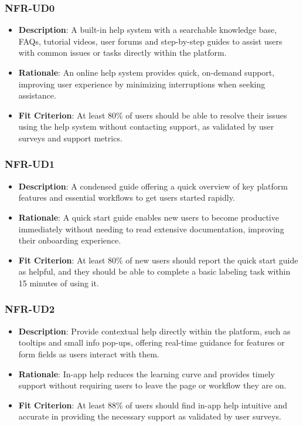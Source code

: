 \documentclass[12pt]{article}
\begin{document}
        \subsubsection*{NFR-UD0} 
        \label{sec:UD0}
        \begin{itemize} 
            \item \textbf{Description}: A built-in help system with a searchable knowledge base, FAQs, tutorial videos, user forums and step-by-step guides to assist users with common issues or tasks directly within the platform.  
            \item \textbf{Rationale}: An online help system provides quick, on-demand support, improving user experience by minimizing interruptions when seeking assistance.  
            \item \textbf{Fit Criterion}: At least 80\% of users should be able to resolve their issues using the help system without contacting support, as validated by user surveys and support metrics.
        \end{itemize}
        \subsubsection*{NFR-UD1}
        \label{sec:UD1}
        \begin{itemize} 
            \item \textbf{Description}: A condensed guide offering a quick overview of key platform features and essential workflows to get users started rapidly.  
            \item \textbf{Rationale}: A quick start guide enables new users to become productive immediately without needing to read extensive documentation, improving their onboarding experience.  
            \item \textbf{Fit Criterion}: At least 80\% of new users should report the quick start guide as helpful, and they should be able to complete a basic labeling task within 15 minutes of using it.
        \end{itemize}
        \subsubsection*{NFR-UD2}
        \label{sec:UD2}
        \begin{itemize} 
            \item \textbf{Description}: Provide contextual help directly within the platform, such as tooltips and small info pop-ups, offering real-time guidance for features or form fields as users interact with them.  
            \item \textbf{Rationale}: In-app help reduces the learning curve and provides timely support without requiring users to leave the page or workflow they are on.  
            \item \textbf{Fit Criterion}: At least 88\% of users should find in-app help intuitive and accurate in providing the necessary support as validated by user surveys.
        \end{itemize}
\end{document}
